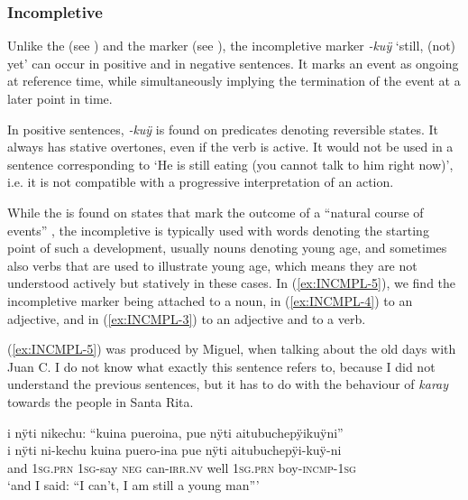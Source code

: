 \subsubsection{Incompletive}\label{sec:Incompletive}

Unlike the  (see ) and the  marker (see ), the incompletive marker \textit{-kuÿ} ‘still, (not) yet’ can occur in positive and in negative sentences. It marks an event as ongoing at reference time, while simultaneously implying the termination of the event at a later point in time.

In positive sentences, \textit{-kuÿ} is found on predicates denoting reversible states. It always has stative overtones, even if the verb is active. It would not be used in a sentence corresponding to ‘He is still eating (you cannot talk to him right now)’, i.e. it is not compatible with a progressive interpretation of an action.

While the  is found on states that mark the outcome of a “natural course of events” \citep[30]{Olsson2013}, the incompletive is typically used with words denoting the starting point of such a development, usually nouns denoting young age, and sometimes also verbs that are used to illustrate young age, which means they are not understood actively but statively in these cases. In (\ref{ex:INCMPL-5}), we find the incompletive marker being attached to a noun, in (\ref{ex:INCMPL-4}) to an adjective, and in (\ref{ex:INCMPL-3}) to an adjective and to a verb.

(\ref{ex:INCMPL-5}) was produced by Miguel, when talking about the old days with Juan C. I do not know what exactly this sentence refers to, because I did not understand the previous sentences, but it has to do with the behaviour of \textit{karay} towards the people in Santa Rita.

\ea\label{ex:INCMPL-5}
\begingl 
\glpreamble i nÿti nikechu: “kuina pueroina, pue nÿti aitubuchepÿikuÿni”\\
\gla i nÿti ni-kechu kuina puero-ina pue nÿti aitubuchepÿi-kuÿ-ni\\ 
\glb and 1\textsc{sg.prn} 1\textsc{sg}-say \textsc{neg} can-\textsc{irr.nv} well 1\textsc{sg.prn} boy-\textsc{incmp}-1\textsc{sg}\\ 
\glft ‘and I said: “I can’t, I am still a young man”’\\ 
\endgl
\trailingcitation{[mqx-p110826l.386]}
\xe

